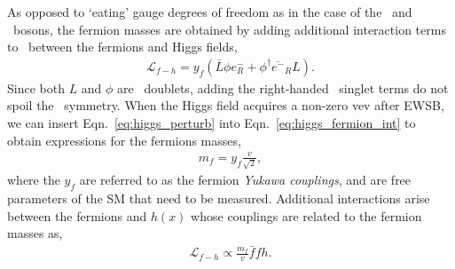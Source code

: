 As opposed to `eating' gauge degrees of freedom as in the case of the \fieldWpm~and \fieldZ~bosons,
the fermion masses are obtained by adding additional interaction terms to \SML~between the
fermions and Higgs fields,
\begin{align}
	\mathcal{L}_{f-h} = y_f \left( \bar{L} \phi e^-_R + \phi^{\dagger} \overline{e^-}_R L\right).
	\label{eq:higgs_fermion_int}
\end{align}
Since both $L$ and $\phi$ are \SUtwo~doublets, adding the right-handed \SUtwo~singlet terms
do not spoil the \SUtwo~symmetry.
When the Higgs field acquires a non-zero vev after EWSB, we can insert Eqn.~\ref{eq:higgs_perturb} into Eqn.~\ref{eq:higgs_fermion_int} to obtain expressions for the fermions masses,
\begin{align}
	m_f = y_f \frac{v}{\sqrt{2}},
	\label{eq:fermion_mass_term}
\end{align}
where the $y_f$ are referred to as the fermion \textit{Yukawa couplings}, and are free parameters
of the SM that need to be measured.
Additional interactions arise between the fermions and $h(x)$ whose couplings are related
to the fermion masses as,
\begin{align}
	\mathcal{L}_{f-h} \propto \frac{m_f}{v} \bar{f}f h.
	\label{eq:higgs_fermion_coupling}
\end{align}

